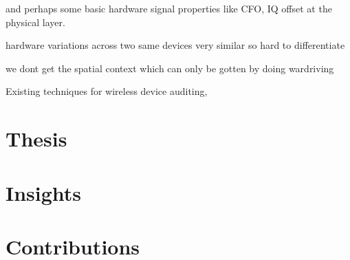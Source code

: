 and perhaps some basic hardware signal properties like CFO, IQ offset at the physical layer.

hardware variations across two same devices very similar so hard to differentiate



we dont get the spatial context which can only be gotten by doing wardriving

Existing techniques for wireless device auditing,


\section{Thesis}
\section{Insights}
\section{Contributions}
